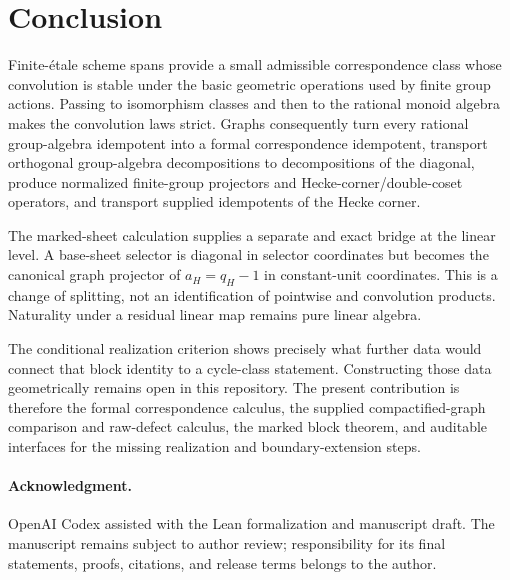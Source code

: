 \documentclass[11pt]{article}
\theoremstyle{definition}
\theoremstyle{remark}
\begin{document}
\section{Conclusion}
\label{sec:conclusion}

Finite-\'etale scheme spans provide a small admissible correspondence class
whose convolution is stable under the basic geometric operations used by
finite group actions.  Passing to isomorphism classes and then to the rational
monoid algebra makes the convolution laws strict.  Graphs consequently turn
every rational group-algebra idempotent into a formal correspondence
idempotent, transport orthogonal group-algebra decompositions to decompositions
of the diagonal, produce normalized finite-group projectors and
Hecke-corner/double-coset operators, and transport supplied idempotents of the
Hecke corner.

The marked-sheet calculation supplies a separate and exact bridge at the
linear level.  A base-sheet selector is diagonal in selector coordinates but
becomes the canonical graph projector of \(a_H=q_H-1\) in constant-unit coordinates.
This is a change of splitting, not an identification of pointwise and
convolution products.  Naturality under a residual linear map remains pure
linear algebra.

The conditional realization criterion shows precisely what further data
would connect that block identity to a cycle-class statement.  Constructing
those data geometrically remains open in this repository.  The present
contribution is therefore the formal correspondence calculus, the supplied
compactified-graph comparison and raw-defect calculus, the marked block
theorem, and auditable interfaces for the missing realization and
boundary-extension steps.

\paragraph{Acknowledgment.}
OpenAI Codex assisted with the Lean formalization and manuscript draft.  The
manuscript remains subject to author review; responsibility for its final
statements, proofs, citations, and release terms belongs to the author.

\begingroup
\small


\endgroup
\end{document}
